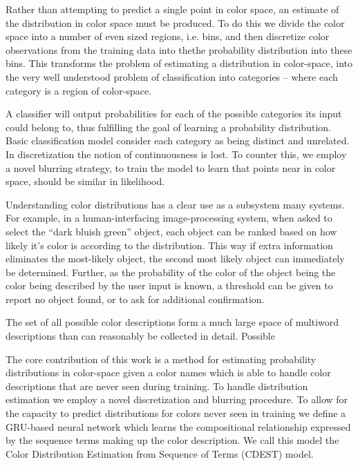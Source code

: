 \documentclass[11pt,letterpaper]{article}
\begin{document}
Rather than attempting to predict a single point in color space, an estimate of the distribution in color space must be produced.
To do this we divide the color space into a number of even sized regions, i.e.  bins, and then discretize color observations from the training data into thethe probability distribution into these bins.
This transforms the problem of estimating a distribution in color-space,
into the very well understood problem of classification into categories -- where each category is a region of color-space.

A classifier will output probabilities for each of the possible categories its input could belong to, thus fulfilling the goal of learning a probability distribution.
Basic classification model consider each category as being distinct and unrelated.
In discretization the notion of continuousness is lost.
To counter this, we employ a novel blurring strategy, to train the model to learn that points near in color space, should be similar in likelihood.


Understanding color distributions has a clear use as a subsystem many systems.
For example, in a human-interfacing image-processing system, when asked to select the ``dark bluish green'' object, each object can be ranked based on how likely it's color is according to the distribution.
This way if extra information eliminates the most-likely object, the second most likely object can immediately be determined.
Further, as the probability of the color of the object being the color being described by the user input is known, a threshold can be given to report no object found, or to ask for additional confirmation.


The set of all possible color descriptions form a much large space of multiword descriptions than can reasonably be collected in detail.
Possible 

The core contribution of this work is a method for estimating probability distributions in color-space given a color names which is able to handle color descriptions that are never seen during training.
To handle distribution estimation we employ a novel discretization and blurring procedure.
To allow for the capacity to predict distributions for colors never seen in training we define a GRU-based neural network which learns the compositional relationship expressed by the sequence terms making up the color description.
We call this model the Color Distribution Estimation from Sequence of Terms (CDEST) model.
\end{document}
